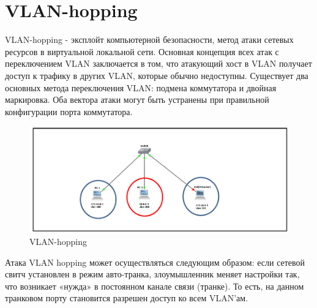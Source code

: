 \documentclass[a4paper, 12pt]{report}
\begin{document}
		\section{VLAN-hopping}
		VLAN-hopping \cite{бирюков2022информационная} - эксплойт компьютерной безопасности, метод атаки сетевых ресурсов в виртуальной локальной сети. Основная концепция всех атак с переключением VLAN заключается в том, что атакующий хост в VLAN получает доступ к трафику в других VLAN, которые обычно недоступны. Существует два основных метода переключения VLAN: подмена коммутатора и двойная маркировка. Оба вектора атаки могут быть устранены при правильной конфигурации порта коммутатора.
			\begin{figure}[h!]
			\centering
			\includegraphics[scale=0.45]{img/image001.png}
			\caption{VLAN-hopping}
			\label{chargets}
		\end{figure}
		Атака VLAN hopping может осуществляться следующим образом: если сетевой свитч установлен в режим авто-транка, злоумышленник меняет настройки так, что возникает «нужда» в постоянном канале связи (транке). То есть, на данном транковом порту становится разрешен доступ ко всем VLAN’ам.
		
	 \printbibliography
	
\end{document}
